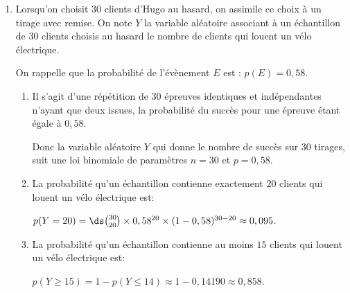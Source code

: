 \begin{enumerate}
\begin{enumerate}
	\end{enumerate}	
\item Lorsqu'on choisit $30$ clients d'Hugo au hasard, on assimile ce choix à un tirage avec remise. 
On note $Y$ la variable aléatoire associant à un échantillon de 30 clients choisis au hasard le nombre de clients qui louent un vélo électrique.

On rappelle que la probabilité de l'évènement $E$ est : $p(E) = 0,58$.
	\begin{enumerate}
		\item 
Il s'agit d'une répétition de 30 épreuves identiques et indépendantes n'ayant que deux issues, la probabilité du succès pour une épreuve étant égale à $0,58$.		
		
		Donc la variable aléatoire $Y$ qui donne le nombre de succès sur 30 tirages, suit une loi binomiale de paramètres $n=30$ et $p=0,58$.
				
		\item La probabilité qu'un échantillon contienne exactement $20$ clients qui louent un vélo électrique est:%
		
$p(Y=20) = \ds\binom{30}{20}\times 0,58^{20}	\times (1-0,58)^{30-20}
\approx 0,095$.

		\item La probabilité qu'un échantillon contienne au moins $15$ clients qui louent un vélo électrique est:%

$p(Y\geqslant 15) = 1 - p(Y\leqslant 14)\approx 1 - 0,14190 \approx 0,858$.

	\end{enumerate}

\end{enumerate}


